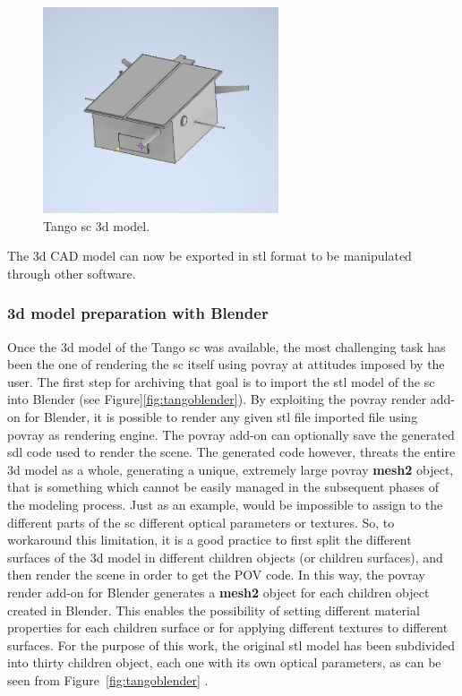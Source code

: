 \begin{figure}[htbp]
  \centering
  \includegraphics[width=0.62\textwidth]{gfx/tangoScreenshot2.eps}
  \caption{Tango \acrshort{sc} \acrshort{3d} model.}
  \label{fig:tango3d}
\end{figure}
The \acrshort{3d} CAD model can now be exported in \acrshort{stl} format to be manipulated through other software.

\subsubsection{\acrshort{3d} model preparation with Blender}
Once the \acrshort{3d} model of the Tango \acrshort{sc} was available, the most challenging task has been the one of rendering the \acrshort{sc} itself using \acrshort{povray} at attitudes imposed by the user.
The first step for archiving that goal is to import the \acrshort{stl} model of the \acrshort{sc} into Blender (see Figure]\ref{fig:tangoblender}). By exploiting the \acrshort{povray} render add-on for Blender, it is possible to render any given \acrshort{stl} file imported file using \acrshort{povray} as rendering engine. The \acrshort{povray} add-on can optionally save the generated \acrshort{sdl} code used to render the scene.
The generated code however, threats the entire \acrshort{3d} model as a whole, generating a unique, extremely large \acrshort{povray} \textbf{mesh2} object, that is something which cannot be easily managed in the subsequent phases of the modeling process. Just as an example, would be impossible to assign to the different parts of the \acrshort{sc} different optical parameters or textures.
So, to workaround this limitation, it is a good practice to first split the different surfaces of the \acrshort{3d} model in different children objects (or children surfaces), and then render the scene in order to get the POV code. In this way, the \acrshort{povray} render add-on for Blender generates a \textbf{mesh2} object for each children object created in Blender.
This enables the possibility of setting different material properties for each children surface or for applying different textures to different surfaces.
For the purpose of this work, the original \acrshort{stl} model has been subdivided into thirty children object, each one with its own optical parameters, as can be seen from Figure~\ref{fig:tangoblender} .

